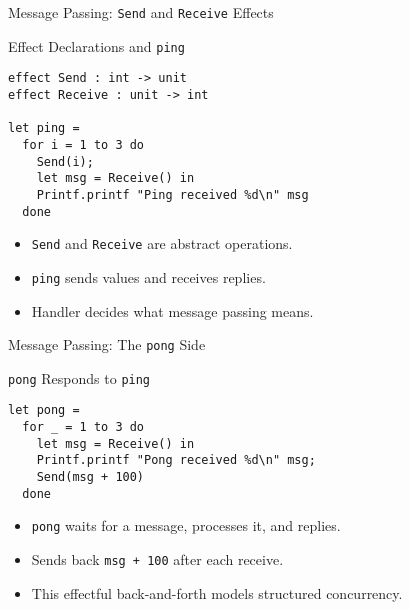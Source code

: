 \begin{frame}[fragile]{Message Passing: \texttt{Send} and \texttt{Receive} Effects}
\vspace{-0.5em}
\begin{block}{\scriptsize Effect Declarations and \texttt{ping}}
\begin{scriptsize}
\begin{verbatim}
effect Send : int -> unit
effect Receive : unit -> int

let ping =
  for i = 1 to 3 do
    Send(i);
    let msg = Receive() in
    Printf.printf "Ping received %d\n" msg
  done
\end{verbatim}
\end{scriptsize}
\end{block}
\vspace{0.3em}
\begin{itemize}
  \item \texttt{Send} and \texttt{Receive} are abstract operations.
  \item \texttt{ping} sends values and receives replies.
  \item Handler decides what message passing means.
\end{itemize}
\end{frame}
\begin{frame}[fragile]{Message Passing: The \texttt{pong} Side}
\vspace{-0.5em}
\begin{block}{\scriptsize \texttt{pong} Responds to \texttt{ping}}
\begin{scriptsize}
\begin{verbatim}
let pong =
  for _ = 1 to 3 do
    let msg = Receive() in
    Printf.printf "Pong received %d\n" msg;
    Send(msg + 100)
  done
\end{verbatim}
\end{scriptsize}
\end{block}
\vspace{0.3em}
\begin{itemize}
  \item \texttt{pong} waits for a message, processes it, and replies.
  \item Sends back \texttt{msg + 100} after each receive.
  \item This effectful back-and-forth models structured concurrency.
\end{itemize}
\end{frame}

